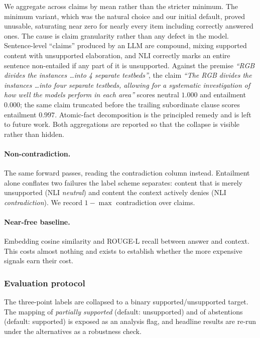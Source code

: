 \documentclass[11pt,a4paper]{article}
\begin{document}
We aggregate across claims by mean rather than the stricter minimum. The
minimum variant, which was the natural choice and our initial default, proved
unusable,
saturating near zero for nearly every item including correctly answered ones.
The cause is claim granularity rather than any defect in the model. Sentence-level
``claims'' produced by an LLM are compound, mixing supported content with
unsupported elaboration, and NLI correctly marks an entire sentence
non-entailed if any part of it is unsupported. Against the premise \emph{``RGB
divides the instances \ldots into 4 separate testbeds''}, the claim \emph{``The
RGB divides the instances \ldots into four separate testbeds, allowing for a
systematic investigation of how well the models perform in each area''} scores
neutral $1.000$ and entailment $0.000$; the same claim truncated before the
trailing subordinate clause scores entailment $0.997$. Atomic-fact decomposition
\cite{min2023factscore} is the principled remedy and is left to future work. Both
aggregations are reported so that the collapse is visible rather than hidden.

\paragraph{Non-contradiction.}
The same forward passes, reading the contradiction column instead. Entailment
alone conflates two failures the label scheme separates: content that is merely
unsupported (NLI \emph{neutral}) and content the context actively denies (NLI
\emph{contradiction}). We record $1 - \max$ contradiction over claims.

\paragraph{Near-free baseline.}
Embedding cosine similarity and ROUGE-L recall between answer and context. This
costs almost nothing and exists to establish whether the more expensive signals
earn their cost.

\subsubsection{Evaluation protocol}
\label{sec:eval}

The three-point labels are collapsed to a binary supported/unsupported target.
The mapping of \emph{partially supported} (default: unsupported) and of
abstentions (default: supported) is exposed as an analysis flag, and headline
results are re-run under the alternatives as a robustness check.
\end{document}
